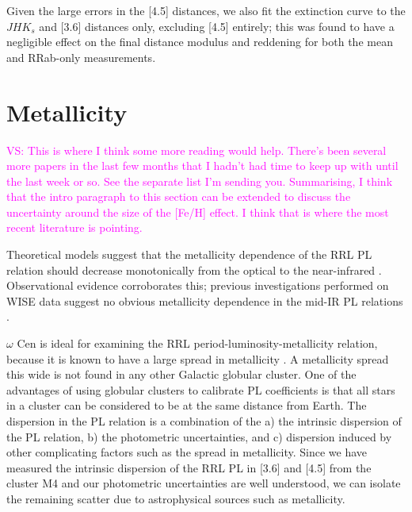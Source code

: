 \documentclass[a4paper,fleqn,usenatbib]{mnras}
\providecommand{\vscomment}[1]{{\textcolor{magenta}{{VS: #1}}}\xspace}
\begin{document}
Given the large errors in the [4.5] distances, we also fit the extinction curve to the $JHK_s$ and [3.6] distances only, excluding [4.5] entirely; this was found to have a negligible effect on the final distance modulus and reddening for both the mean and RRab-only measurements.

\section{Metallicity}
\label{sec:metallicity}

\vscomment{This is where I think some more reading would help. There's been several more papers in the last few months that I hadn't had time to keep up with until the last week or so. See the separate list I'm sending you. Summarising, I think that the intro paragraph to this section can be extended to discuss the uncertainty around the size of the [Fe/H] effect. I think that is where the most recent literature is pointing.}

Theoretical models suggest that the metallicity dependence of the RRL PL relation should decrease monotonically from the optical to the near-infrared \citep{2001MNRAS.326.1183B, 2004ApJS..154..633C}. Observational evidence corroborates this; previous investigations performed on WISE data suggest no obvious metallicity dependence in the mid-IR PL relations \citep{2013ApJ...776..135M}.

$\omega$ Cen is ideal for examining the RRL period-luminosity-metallicity relation, because it is known to have a large spread in metallicity \citep[$0.8~\leq~\Delta~\text{[Fe/H]}~\leq~1.4$~dex][]{2014ApJ...791..107V, 2012ApJ...746...14M, 2010ApJ...722.1373J}.
A metallicity spread this wide is not found in any other Galactic globular cluster. One of the advantages of using globular clusters to calibrate PL coefficients is that all stars in a cluster can be considered to be at the same distance from Earth. The dispersion in the PL relation is a combination of the a) the intrinsic dispersion of the PL relation, b) the photometric uncertainties, and c) dispersion induced by other complicating factors such as the spread in metallicity. Since we have measured the intrinsic dispersion of the RRL PL in [3.6] and [4.5] from the cluster M4 \citep{2015ApJ...808...11N} and our photometric uncertainties are well understood, we can isolate the remaining scatter due to astrophysical sources such as metallicity. %
\end{document}
